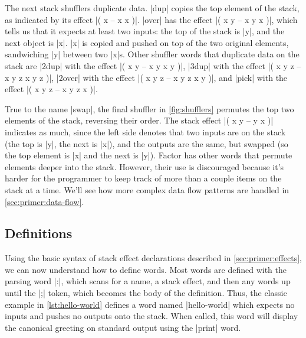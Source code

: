 The next stack shufflers duplicate data.  \factor|dup| copies the top element
of the stack, as indicated by its effect \factor|( x -- x x )|.  \factor|over|
has the effect \factor|( x y -- x y x )|, which tells us that it expects at
least two inputs: the top of the stack is \factor|y|, and the next object is
\factor|x|.  \factor|x| is copied and pushed on top of the two original
elements, sandwiching \factor|y| between two \factor|x|s.  Other shuffler words
that duplicate data on the stack are
%
\factor|2dup| with the effect \factor|( x y -- x y x y )|,
%
\factor|3dup| with the effect \factor|( x y z -- x y z x y z )|,
%
\factor|2over| with the effect \factor|( x y z -- x y z x y )|, and
%
\factor|pick| with the effect \factor|( x y z -- x y z x )|.

True to the name \factor|swap|, the final shuffler in \vref{fig:shufflers}
permutes the top two elements of the stack, reversing their order.  The stack
effect
%
\factor|( x y -- y x )|
%
indicates as much, since the left side denotes that two inputs are on the stack
(the top is \factor|y|, the next is \factor|x|), and the outputs are the same,
but swapped (so the top element is \factor|x| and the next is \factor|y|).
Factor has other words that permute elements deeper into the stack.  However,
their use is discouraged because it's harder for the programmer to keep track
of more than a couple items on the stack at a time.  We'll see how more complex
data flow patterns are handled in \cref{sec:primer:data-flow}.

\subsection{Definitions}



Using the basic syntax of stack effect declarations described in
\cref{sec:primer:effects}, we can now understand how to define words.  Most
words are defined with the parsing word \factor|:|, which scans for a name, a
stack effect, and then any words up until the \factor|;| token, which becomes
the body of the definition.  Thus, the classic example in
\vref{lst:hello-world} defines a word named \factor|hello-world| which expects
no inputs and pushes no outputs onto the stack.  When called, this word will
display the canonical greeting on standard output using the \factor|print|
word.


